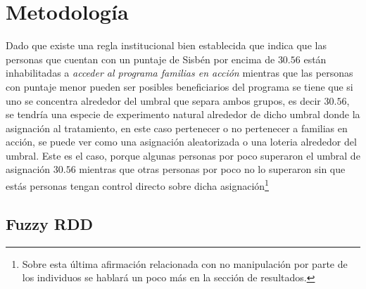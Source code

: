 \documentclass[AER]{AEA}
\begin{document}

\section{Metodología}

Dado que existe una regla institucional bien establecida que indica que las personas que cuentan con un puntaje de Sisbén por encima de $30.56$ están inhabilitadas a \textit{acceder al programa familias en acción} mientras que las personas con puntaje menor pueden ser posibles beneficiarios del programa se tiene que si uno se concentra alrededor del umbral que separa ambos grupos, es decir $30.56$, se tendría una especie de experimento natural alrededor de dicho umbral donde la asignación al tratamiento, en este caso pertenecer o no pertenecer a familias en acción, se puede ver como una asignación aleatorizada o una loteria alrededor del umbral. Este es el caso, porque algunas personas por poco superaron el umbral de asignación $30.56$ mientras que otras personas por poco no lo superaron sin que estás personas tengan control directo sobre dicha asignación\footnote{Sobre esta última afirmación relacionada con no manipulación por parte de los individuos se hablará un poco más en la sección de resultados.}

\subsection{Fuzzy RDD}
\end{document}
